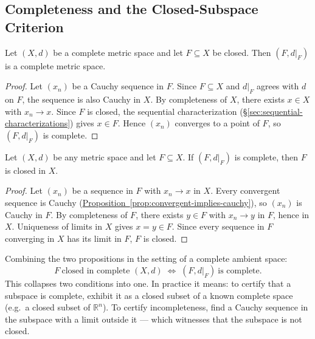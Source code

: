 \subsection{Completeness and the Closed-Subspace Criterion}
\label{sec:completeness-closed}

\begin{proposition}
\label{prop:closed-subspace-complete}
Let $(X,d)$ be a complete metric space and let $F \subseteq X$ be closed.
Then $(F, d|_F)$ is a complete metric space.
\end{proposition}

\begin{proof}
Let $(x_n)$ be a Cauchy sequence in $F$.
Since $F \subseteq X$ and $d|_F$ agrees with $d$ on $F$, the sequence is
also Cauchy in $X$.
By completeness of $X$, there exists $x \in X$ with $x_n \to x$.
Since $F$ is closed, the sequential characterization
(\hyperref[sec:sequential-characterizations]{\S\ref*{sec:sequential-characterizations}})
gives $x \in F$.
Hence $(x_n)$ converges to a point of $F$, so $(F, d|_F)$ is complete.
\end{proof}

\begin{proposition}
\label{prop:complete-subspace-closed}
Let $(X,d)$ be any metric space and let $F \subseteq X$.
If $(F, d|_F)$ is complete, then $F$ is closed in $X$.
\end{proposition}

\begin{proof}
Let $(x_n)$ be a sequence in $F$ with $x_n \to x$ in $X$.
Every convergent sequence is Cauchy
(\hyperref[prop:convergent-implies-cauchy]{Proposition~\ref*{prop:convergent-implies-cauchy}}),
so $(x_n)$ is Cauchy in $F$.
By completeness of $F$, there exists $y \in F$ with $x_n \to y$ in $F$,
hence in $X$.
Uniqueness of limits in $X$ gives $x = y \in F$.
Since every sequence in $F$ converging in $X$ has its limit in $F$,
$F$ is closed.
\end{proof}

\begin{remark*}
Combining the two propositions in the setting of a complete ambient space:
\[
  \boxed{
    F\ \text{closed in complete } (X,d)
    \;\iff\;
    (F, d|_F)\ \text{is complete.}
  }
\]
This collapses two conditions into one.
In practice it means: to certify that a subspace is complete, exhibit
it as a closed subset of a known complete space (e.g.\ a closed subset
of $\mathbb{R}^n$).
To certify incompleteness, find a Cauchy sequence in the subspace with
a limit outside it --- which witnesses that the subspace is not closed.
\end{remark*}

